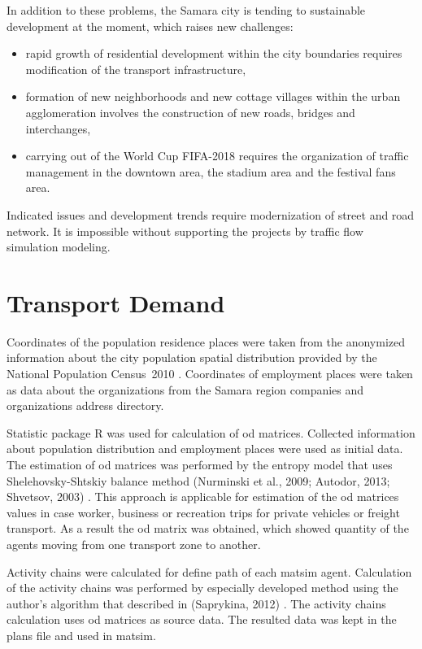 In addition to these problems, the Samara city is tending to sustainable development at the moment, which raises new challenges:
\begin{itemize}
\item rapid growth of residential development within the city boundaries requires modification of the transport infrastructure,
\item formation of new neighborhoods and new cottage villages within the urban agglomeration involves the construction of new roads, bridges and interchanges,
\item carrying out of the World Cup FIFA-2018 requires the organization of traffic management in the downtown area, the stadium area and the festival fans area.
\end{itemize}

Indicated issues and development trends require modernization of street and road network. It is impossible without supporting the projects by traffic flow simulation modeling.

\section{Transport Demand}
Coordinates of the population residence places were taken from the anonymized information about the city population spatial distribution provided by the National Population Census~2010 \citep[][]{GKS_2010}. Coordinates of employment places were taken as data about the organizations from the Samara region companies and organizations address directory.

Statistic package R was used for calculation of \gls{od} matrices. Collected information about population distribution and employment places were used as initial data. The estimation of \gls{od} matrices was performed by the entropy model that uses Shelehovsky-Shtskiy balance method (Nurminski et al., 2009; Autodor, 2013; Shvetsov, 2003) \citep[][]{}. This approach is applicable for estimation of the \gls{od} matrices values in case worker, business or recreation trips for private vehicles or freight transport. As a result the \gls{od} matrix was obtained, which showed quantity of the agents moving from one transport zone to another.

Activity chains were calculated for define path of each \gls{matsim} agent. Calculation of the activity chains was performed by especially developed method using the author's algorithm that described in (Saprykina, 2012) \citet[][]{}. The activity chains calculation uses \gls{od} matrices as source data. The resulted data was kept in the plans file and used in \gls{matsim}.


